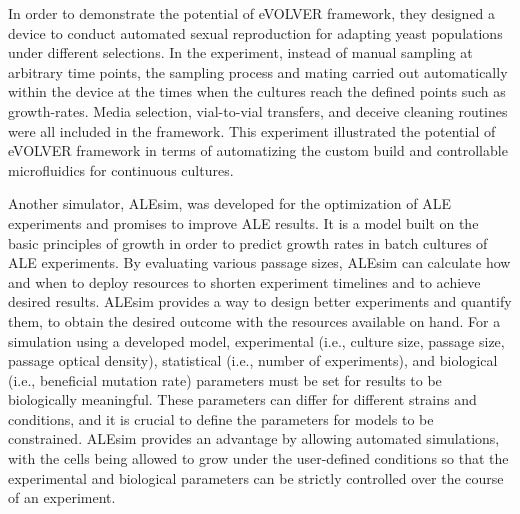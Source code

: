 In order to demonstrate the potential of eVOLVER framework, they designed a device to conduct automated sexual reproduction for adapting yeast populations under different selections. In the experiment, instead of manual sampling at arbitrary time points, the sampling process and mating carried out automatically within the device at the times when the cultures reach the defined points such as growth-rates. Media selection, vial-to-vial transfers, and deceive cleaning routines were all included in the framework. This experiment illustrated the potential of eVOLVER framework in terms of automatizing the custom build and controllable microfluidics for continuous cultures.




Another simulator, ALEsim\cite{lacroix2017model}, was developed for the optimization of ALE experiments and promises to improve ALE results. It is a model built on the basic principles of growth in order to predict growth rates in batch cultures of ALE experiments. By evaluating various passage sizes, ALEsim can calculate how and when to deploy resources to shorten experiment timelines and to achieve desired results. ALEsim provides a way to design better experiments and quantify them, to obtain the desired outcome with the resources available on hand. For a simulation using a developed model, experimental (i.e., culture size, passage size, passage optical density), statistical (i.e., number of experiments), and biological (i.e., beneficial mutation rate) parameters must be set for results to be biologically meaningful. These parameters can differ for different strains and conditions, and it is crucial to define the parameters for models to be constrained. ALEsim provides an advantage by allowing automated simulations, with the cells being allowed to grow under the user-defined conditions so that the experimental and biological parameters can be strictly controlled over the course of an experiment.



